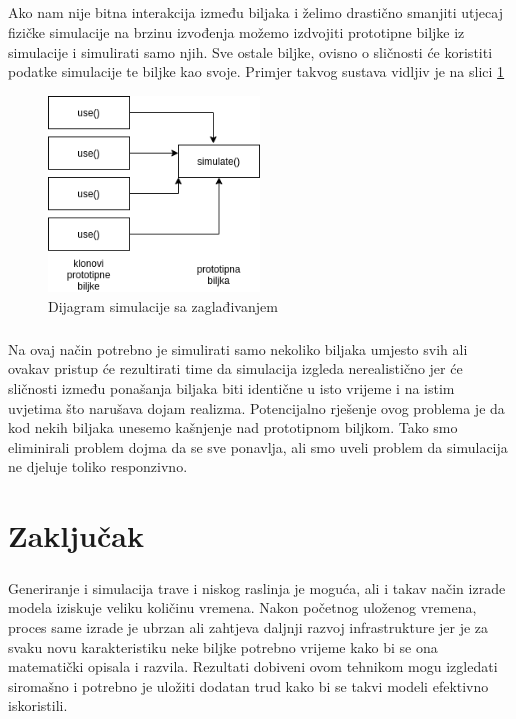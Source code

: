 \documentclass[times, utf8, diplomski]{fer}
\begin{document}
\paragraph{}
Ako nam nije bitna interakcija između biljaka i želimo drastično smanjiti utjecaj 
fizičke simulacije na brzinu izvođenja možemo izdvojiti prototipne biljke iz simulacije i 
simulirati samo njih. Sve ostale biljke, ovisno o sličnosti će koristiti podatke simulacije 
te biljke kao svoje. Primjer takvog sustava vidljiv je na slici \ref{fig:531-3}
\begin{figure}[h]
	\centering
	\includegraphics[width=0.5\textwidth]{img/531-3}
	\caption{Dijagram simulacije sa zaglađivanjem}
	\label{fig:531-3}
\end{figure}
\paragraph{}
Na ovaj način potrebno je simulirati samo nekoliko biljaka umjesto svih ali ovakav pristup 
će rezultirati time da simulacija izgleda nerealistično jer će sličnosti između ponašanja 
biljaka biti identične u isto vrijeme i na istim uvjetima što narušava dojam realizma. 
Potencijalno rješenje ovog problema je da kod nekih biljaka unesemo kašnjenje nad 
prototipnom biljkom. Tako smo eliminirali problem dojma da se sve ponavlja, ali smo 
uveli problem da simulacija ne djeluje toliko responzivno.

\chapter{Zaključak}
\paragraph{}
Generiranje i simulacija trave i niskog raslinja je moguća, ali i takav način izrade 
modela iziskuje veliku količinu vremena. Nakon početnog uloženog vremena, proces same izrade 
je ubrzan ali zahtjeva daljnji razvoj infrastrukture jer je za svaku novu karakteristiku 
neke biljke potrebno vrijeme kako bi se ona matematički opisala i razvila. Rezultati 
dobiveni ovom tehnikom mogu izgledati siromašno i potrebno je uložiti dodatan trud kako bi 
se takvi modeli efektivno iskoristili.
\end{document}
